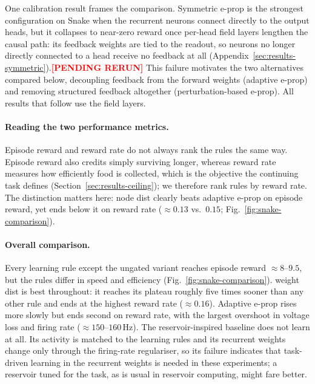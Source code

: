 \documentclass[10pt,twocolumn]{article}
\newcommand{\pending}[1]{\textcolor{red}{\bfseries[PENDING RERUN#1]}}
\newcommand{\method}{perturbation-based e-prop}   %
\newcommand{\variant}[1]{\textsf{#1}} %
\begin{document}
One calibration result frames the comparison. Symmetric e-prop is the
strongest configuration on Snake when the recurrent neurons connect directly
to the output heads, but it collapses to near-zero reward once per-head field
layers lengthen the causal path: its feedback weights are tied to the readout,
so neurons no longer directly connected to a head receive no feedback at all
(Appendix~\ref{sec:results-symmetric}).\pending{} This failure motivates the
two alternatives compared below, decoupling feedback from the forward weights
(adaptive e-prop) and removing structured feedback altogether (\method{}). All results that follow use the field layers.

\paragraph{Reading the two performance metrics.}
Episode reward and reward rate do not always rank the rules the same way.
Episode reward also credits simply surviving longer, whereas reward rate
measures how efficiently food is collected, which is the objective the
continuing task defines (Section~\ref{sec:results-ceiling}); we therefore rank
rules by reward rate. The distinction matters here: \variant{node dist} clearly
beats adaptive e-prop on episode reward, yet ends below it on reward rate
($\approx 0.13$ vs.\ $0.15$; Fig.~\ref{fig:snake-comparison}).

\paragraph{Overall comparison.}
Every learning rule except the ungated variant reaches episode reward
$\approx 8$--$9.5$, but the rules differ in speed and efficiency
(Fig.~\ref{fig:snake-comparison}). \variant{weight dist} is best throughout: it
reaches its plateau roughly five times sooner than any other rule and ends at
the highest reward rate ($\approx 0.16$). Adaptive e-prop rises more slowly but
ends second on reward rate, with the largest overshoot in voltage loss and
firing rate ($\approx 150$--$160$\,Hz). The reservoir-inspired baseline does not
learn at all. Its activity is matched to the learning rules and its recurrent
weights change only through the firing-rate regulariser, so its failure
indicates that task-driven learning in the recurrent weights is needed in these
experiments; a reservoir tuned for the task, as is usual in reservoir
computing, might fare better.
\end{document}
